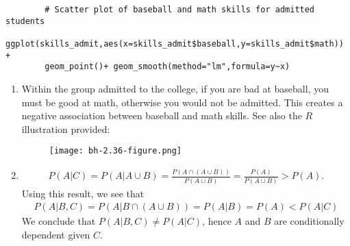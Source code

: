 \begin{exercise}[BH.2.36]
\begin{solution}
\begin{verbatim}
		# Scatter plot of baseball and math skills for admitted students
		ggplot(skills_admit,aes(x=skills_admit$baseball,y=skills_admit$math)) +
		geom_point()+ geom_smooth(method="lm",formula=y~x)
	\end{verbatim}
	\begin{enumerate}
		\item Within the group admitted to the college, if you are bad at baseball, you must be good at math, otherwise you would not be admitted. This creates a negative association between baseball and math skills. See also the $R$ illustration provided:
		\begin{figure}[htbp!]
			\texttt{[image: bh-2.36-figure.png]}
		\end{figure}
		\item \begin{align*}
			P(A|C) =P(A|A\cup B) = \frac{P(A\cap(A\cup B))}{P(A\cup B)} = \frac{P(A)}{P(A\cup B)}>P(A).
		\end{align*}
		Using this result, we see that
		\begin{align*}
			P(A|B,C) = P(A|B\cap (A\cup B)) =P(A|B) = P(A)<P(A|C)
		\end{align*}
		We conclude that $P(A|B,C)\neq P(A|C)$, hence $A$ and $B$ are conditionally dependent given $C$.
	\end{enumerate}
\end{solution}
\end{exercise}

